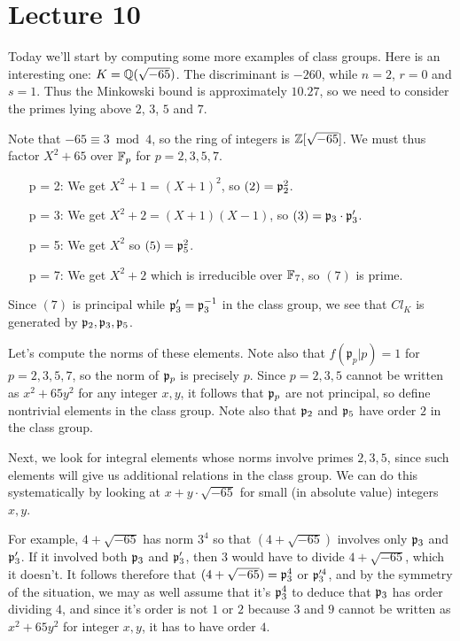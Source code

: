 \section{Lecture 10}

Today we'll start by computing some more examples of class groups.
Here is an interesting one: $K = \mathbb{Q}(\sqrt{-65})$.
The discriminant is $-260$, while $n = 2$, $r = 0$ and $s = 1$.
Thus the Minkowski bound is approximately $10.27$, so we need to consider the primes lying above $2$, $3$, $5$ and $7$.

Note that $-65 \equiv 3 \bmod 4$, so the ring of integers is $\mathbb{Z}[\sqrt{-65}]$.
We must thus factor $X^{2} + 65$ over $\mathbb{F}_{p}$ for $p = 2,3,5,7$.
\begin{enumerate}
  \item[p = 2:] We get $X^{2}+1 = (X+1)^{2}$, so $(2) = \mathfrak{p}_{2}^{2}$.
  \item[p = 3:] We get $X^{2}+2 = (X+1)(X-1)$, so $(3) = \mathfrak{p}_{3} \cdot \mathfrak{p}_{3}'$.
  \item[p = 5:] We get $X^{2}$ so $(5) = \mathfrak{p}_{5}^{2}$.
  \item[p = 7:] We get $X^{2} + 2$ which is irreducible over $\mathbb{F}_{7}$, so $(7)$ is prime.
\end{enumerate}
Since $(7)$ is principal while $\mathfrak{p}_{3}' = \mathfrak{p}_{3}^{-1}$ in the class group, we see that $Cl_{K}$ is generated by $\mathfrak{p}_{2},\mathfrak{p}_{3},\mathfrak{p}_{5}$.

Let's compute the norms of these elements.
Note also that $f(\mathfrak p_p|p) = 1$ for $p=2, 3, 5, 7$, so the norm of $\mathfrak{p}_{p}$ is precisely $p$.
Since $p = 2,3,5$ cannot be written as $x^{2} + 65 y^{2}$ for any integer $x,y$, it follows that $\mathfrak{p}_{p}$ are not principal, so define nontrivial elements in the class group.
Note also that $\mathfrak{p}_{2}$ and $\mathfrak{p}_{5}$ have order $2$ in the class group.

Next, we look for integral elements whose norms involve primes $2,3,5$, since such elements will give us additional relations in the class group.
We can do this systematically by looking at $x + y \cdot \sqrt{-65}$ for small (in absolute value) integers $x,y$.

For example, $4 + \sqrt{-65}$ has norm $3^{4}$ so that $(4 + \sqrt{-65})$ involves only $\mathfrak{p}_{3}$ and $\mathfrak{p}_{3}'$.
If it involved both $\mathfrak{p}_{3}$ and $\mathfrak{p}_{3}'$, then $3$ would have to divide $4 + \sqrt{-65}$, which it doesn't.
It follows therefore that $(4 + \sqrt{-65}) = \mathfrak{p}_{3}^{4}$ or $\mathfrak{p}_{3}'^{4}$, and by the symmetry of the situation, we may as well assume that it's $\mathfrak{p}_{3}^{4}$ to deduce that $\mathfrak{p}_{3}$ has order dividing $4$, and since it's order is not $1$ or $2$ because $3$ and $9$ cannot be written as $x^2+65y^2$ for integer $x,y$, it has to have order $4$.

